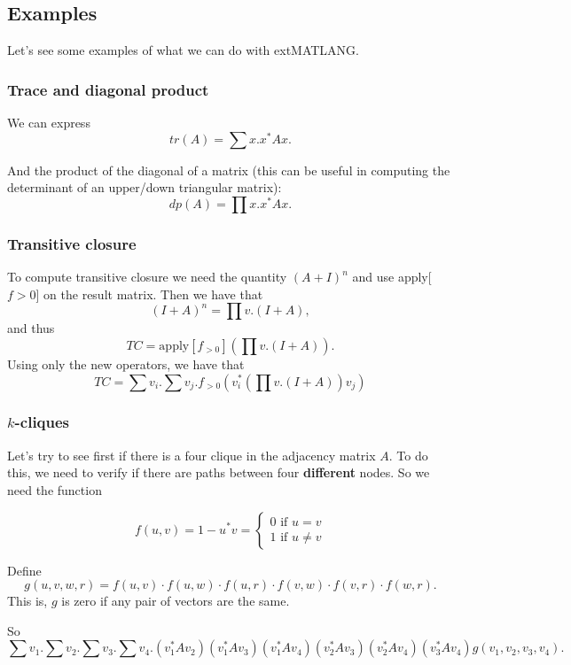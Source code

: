 \subsection{Examples}

Let's see some examples of what we can do with extMATLANG.

\subsubsection{Trace and diagonal product}

We can express $$tr(A)=\sum x. x^*Ax.$$

And the product of the diagonal of a matrix (this can be useful in computing the determinant of an upper/down triangular matrix): $$dp(A)=\prod x. x^*Ax.$$

\subsubsection{Transitive closure}

To compute transitive closure we need the quantity $(A+I)^n$ and use apply[$f>0$] on the result matrix. Then we have that $$(I+A)^n=\prod v. (I+A),$$ and thus $$TC = \text{apply}\left[ f_{>0}\right]\left( \prod v. (I+A) \right).$$
Using only the new operators, we have that $$TC=\sum v_i. \sum v_j. f_{>0}\left(v_i^*\left(\prod v. (I+A)\right)v_j\right)$$

\subsubsection{$k$-cliques}

Let's try to see first if there is a four clique in the adjacency matrix $A$. To do this, we need to verify if there are paths between four \textbf{different} nodes. So we need the function 

\[
  			f(u,v)=1-u^*v=\begin{cases}
               0 \text{ if } u=v \\
               1 \text{ if } u\neq v
            \end{cases}
		\]

Define $$g(u,v,w,r)=f(u,v)\cdot f(u,w)\cdot f(u,r)\cdot f(v,w)\cdot f(v,r)\cdot f(w,r).$$ This is, $g$ is zero if any pair of vectors are the same.
		
So $$\sum v_1.\sum v_2. \sum v_3. \sum v_4. (v_1^*Av_2)(v_1^*Av_3)(v_1^*Av_4)(v_2^*Av_3)(v_2^*Av_4)(v_3^*Av_4)g(v_1,v_2,v_3,v_4).$$

\label{sec:extmatlang}